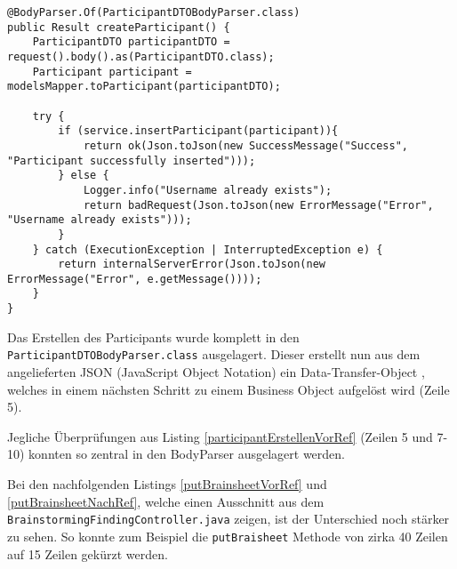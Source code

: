 \begin{lstlisting}[caption={Participant erstellen nach Refactoring}, label=participantErstellenNachRef]
@BodyParser.Of(ParticipantDTOBodyParser.class)
public Result createParticipant() {
    ParticipantDTO participantDTO = request().body().as(ParticipantDTO.class);
    Participant participant = modelsMapper.toParticipant(participantDTO);

    try {
        if (service.insertParticipant(participant)){
            return ok(Json.toJson(new SuccessMessage("Success", "Participant successfully inserted")));
        } else {
            Logger.info("Username already exists");
            return badRequest(Json.toJson(new ErrorMessage("Error", "Username already exists")));
        }
    } catch (ExecutionException | InterruptedException e) {
        return internalServerError(Json.toJson(new ErrorMessage("Error", e.getMessage())));
    }
}
\end{lstlisting}

Das Erstellen des Participants wurde komplett in den \texttt{Participant\-DTO\-Body\-Parser\-.class} ausgelagert. Dieser erstellt nun aus dem angelieferten JSON (JavaScript Object Notation) ein Data-Transfer-Object \cite{DTO}, welches in einem nächsten Schritt zu einem Business Object aufgelöst wird (Zeile 5).

Jegliche Überprüfungen aus Listing \ref{participantErstellenVorRef} (Zeilen 5 und 7-10) konnten so zentral in den BodyParser ausgelagert werden.

Bei den nachfolgenden Listings \ref{putBrainsheetVorRef} und \ref{putBrainsheetNachRef}, welche einen Ausschnitt aus dem \texttt{Brain\-storming\-Finding\-Controller\-.java} zeigen, ist der Unterschied noch stärker zu sehen. So konnte zum Beispiel die \texttt{putBraisheet} Methode von zirka 40 Zeilen auf 15 Zeilen gekürzt werden. 

